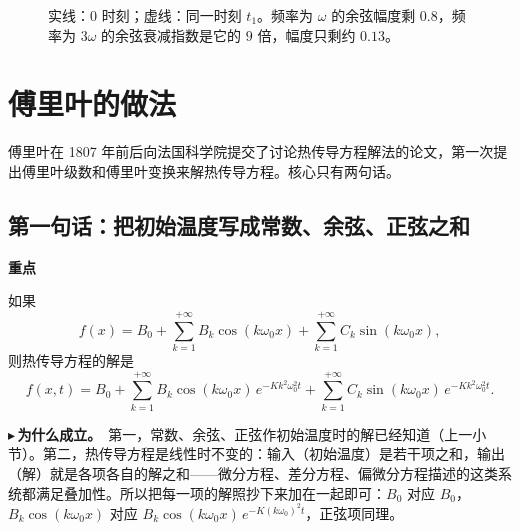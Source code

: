 \documentclass[UTF8,a4paper,11pt]{ctexart}
\newenvironment{remember}{\begin{rememberbox}\textbf{重点}\par\smallskip}{\end{rememberbox}}
\newcommand{\taxes}[5][t]{%
  \draw[->] (#2,0) -- (#3,0) node[right,font=\scriptsize] {$#1$};
  \draw[->] (0,#5) -- (0,#4);
  \node[anchor=north east,font=\tiny,gray!60!black,inner sep=1pt] at (0,-0.02) {$0$};}
\newcommand{\yt}[2]{\draw (0,#1) -- (-0.1,#1) node[anchor=east,font=\tiny,gray!60!black,fill=white,inner sep=0.6pt] {$#2$};}
\newcounter{ex}[section]
\newcommand{\point}[1]{\par\addvspace{1ex}\noindent\textcolor{ptteal}{$\blacktriangleright$\,\textbf{#1}}\ }
\begin{document}
\begin{figure}[H]
\centering
{}
\caption{实线：$0$ 时刻；虚线：同一时刻 $t_1$。频率为 $\omega$ 的余弦幅度剩 $0.8$，频率为 $3\omega$ 的余弦衰减指数是它的 $9$ 倍，幅度只剩约 $0.13$。}
\end{figure}

\section{傅里叶的做法}\label{sec:fourier}
傅里叶在 1807 年前后向法国科学院提交了讨论热传导方程解法的论文，第一次提出傅里叶级数和傅里叶变换来解热传导方程。核心只有两句话。

\subsection{第一句话：把初始温度写成常数、余弦、正弦之和}
\begin{remember}
如果
\[
f(x)=B_0+\sum_{k=1}^{+\infty}B_k\cos(k\omega_0x)+\sum_{k=1}^{+\infty}C_k\sin(k\omega_0x),
\]
则热传导方程的解是
\[
f(x,t)=B_0+\sum_{k=1}^{+\infty}B_k\cos(k\omega_0x)\,e^{-Kk^2\omega_0^2t}+\sum_{k=1}^{+\infty}C_k\sin(k\omega_0x)\,e^{-Kk^2\omega_0^2t}.
\]
\end{remember}

\point{为什么成立。}第一，常数、余弦、正弦作初始温度时的解已经知道（上一小节）。第二，热传导方程是线性时不变的：输入（初始温度）是若干项之和，输出（解）就是各项各自的解之和——微分方程、差分方程、偏微分方程描述的这类系统都满足叠加性。所以把每一项的解照抄下来加在一起即可：$B_0$ 对应 $B_0$，$B_k\cos(k\omega_0x)$ 对应 $B_k\cos(k\omega_0x)\,e^{-K(k\omega_0)^2t}$，正弦项同理。
\end{document}
